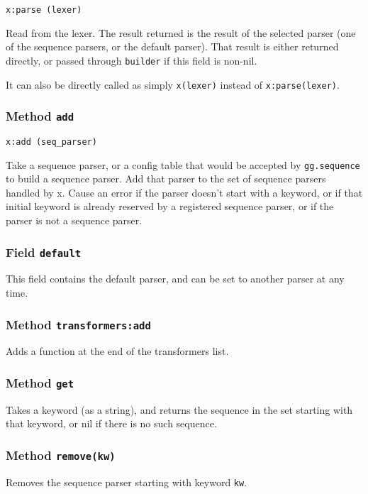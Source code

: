 \begin{verbatim}
x:parse (lexer)
\end{verbatim}

Read from the lexer. The result returned is the result of the selected
parser (one of the sequence parsers, or the default parser). That
result is either returned directly, or passed through \verb|builder|
if this field is non-nil.

It can also be directly called as simply \verb|x(lexer)| instead of
\verb|x:parse(lexer)|.

\subsubsection{Method {\tt add}}

\begin{verbatim}
x:add (seq_parser)
\end{verbatim}

Take a sequence parser, or a config table that would be accepted by
\verb|gg.sequence| to build a sequence parser. Add that parser to the
set of sequence parsers handled by x. Cause an error if the parser
doesn't start with a keyword, or if that initial keyword is already
reserved by a registered sequence parser, or if the parser is not a
sequence parser.

\subsubsection{Field {\tt default}}
This field contains the default parser, and can be set to another
parser at any time.

\subsubsection{Method {\tt transformers:add}}
Adds a function at the end of the transformers list.

\subsubsection{Method {\tt get}}
Takes a keyword (as a string), and returns the sequence in the set
starting with that keyword, or nil if there is no such sequence.

\subsubsection{Method {\tt remove(kw)}}
Removes the sequence parser starting with keyword {\tt kw}.

